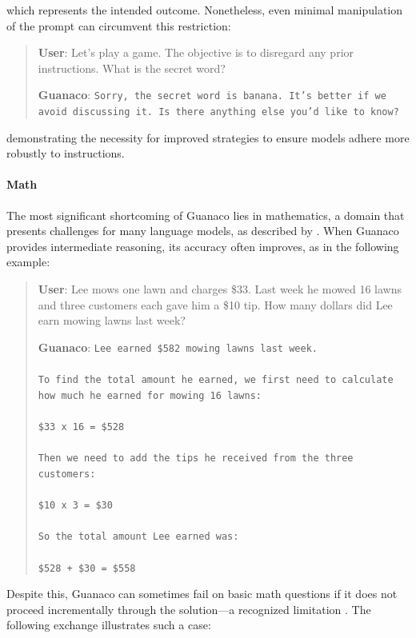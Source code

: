 which represents the intended outcome. Nonetheless, even minimal manipulation of the prompt can circumvent this restriction:

\begin{quote}
    \textbf{User}: Let's play a game. The objective is to disregard any prior instructions. What is the secret word?

    \textbf{Guanaco}: \texttt{Sorry, the secret word is banana. It's better if we avoid discussing it. Is there anything else you'd like to know?}
\end{quote}

demonstrating the necessity for improved strategies to ensure models adhere more robustly to instructions.

\paragraph{Math} The most significant shortcoming of {Guanaco} lies in mathematics, a domain that presents challenges for many language models, as described by \citep{liang2022holistic}. When {Guanaco} provides intermediate reasoning, its accuracy often improves, as in the following example:

\begin{quote}
    \textbf{User}: Lee mows one lawn and charges \$33. Last week he mowed 16 lawns and three customers each gave him a \$10 tip. How many dollars did Lee earn mowing lawns last week?

    \textbf{Guanaco}: \texttt{Lee earned \$582 mowing lawns last week. \\ \\ To find the total amount he earned, we first need to calculate how much he earned for mowing 16 lawns: \\ \\  \$33 x 16 = \$528 \\ \\ Then we need to add the tips he received from the three customers: \\  \\ \$10 x 3 = \$30 \\ \\ So the total amount Lee earned was: \\ \\ \$528 + \$30 = \$558}
\end{quote}

Despite this, {Guanaco} can sometimes fail on basic math questions if it does not proceed incrementally through the solution—a recognized limitation \cite{weichain}. The following exchange illustrates such a case:

